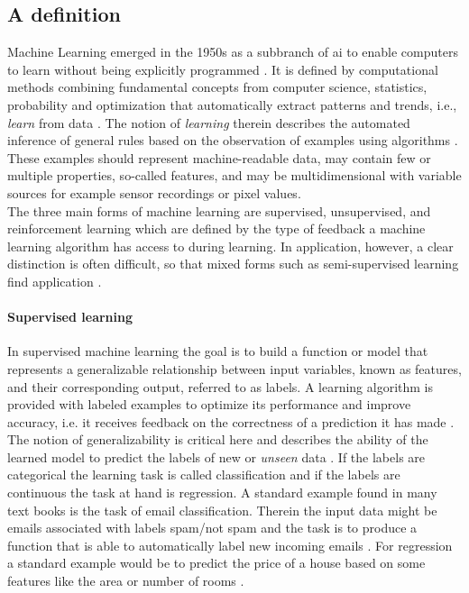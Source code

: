 
\subsection{A definition}
Machine Learning emerged in the 1950s as a subbranch of \gls{ai} to enable computers to learn without being explicitly programmed \cite{Samual1959}. It is defined by computational methods combining fundamental concepts from computer science, statistics, probability and optimization that automatically extract patterns and trends, i.e., \textit{learn} from data \cite{Hastie2009}. The notion of \textit{learning} therein describes the automated inference of general rules based on the observation of examples using algorithms \cite{Von_luxburg2011}. These examples should represent machine-readable data, may contain few or multiple properties, so-called features, and may be multidimensional with variable sources for example sensor recordings or pixel values.\\
The three main forms of machine learning are supervised, unsupervised, and reinforcement learning which are defined by the type of feedback a machine learning algorithm has access to during learning. In application, however, a clear distinction is often difficult, so that mixed forms such as semi-supervised learning find application \cite{Russell2015}.

\paragraph{Supervised learning}
In supervised machine learning the goal is to build a function or model that represents a generalizable relationship between input variables, known as features, and their corresponding output, referred to as labels. A learning algorithm is provided with labeled examples to optimize its performance and improve accuracy, i.e. it receives feedback on the correctness of a prediction it has made \cite{Russell2015}. The notion of generalizability is critical here and describes the ability of the learned model to predict the labels of new or \textit{unseen} data \cite{Daumé2017}. If the labels are categorical the learning task is called classification and if the labels are continuous the task at hand is regression. A standard example found in many text books is the task of email classification. Therein the input data might be emails associated with labels spam/not spam and the task is to produce a function that is able to automatically label new incoming emails \cite{Shalev2014}. For regression a standard example would be to predict the price of a house based on some features like the area or number of rooms \cite{Ng2022cs229notes}.

